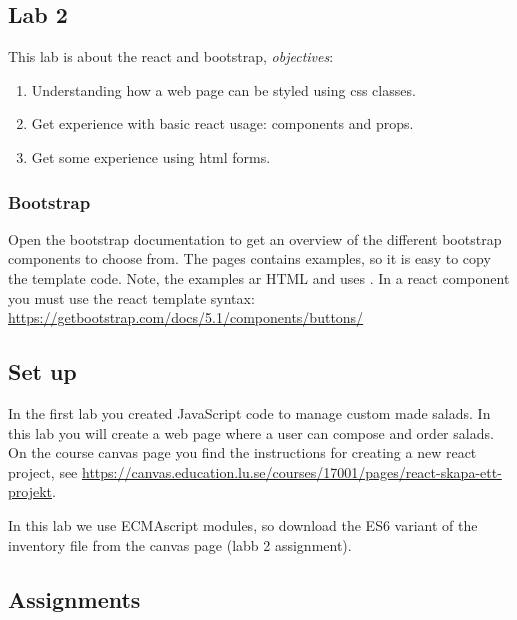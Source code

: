 \documentclass[fleqn, article, a4paper]{memoir}
\begin{document}
\maketitle
\thispagestyle{titlepage}
\vspace{-4cm}

\subsection*{Lab 2}

\n This lab is about the react and bootstrap, \emph{objectives}:

\begin{enumerate}\firmlist
\item Understanding how a web page can be styled using css classes.
\item Get experience with basic react usage: components and props.
\item Get some experience using html forms.
\end{enumerate}

\subsubsection*{Bootstrap}
Open the bootstrap documentation to get an overview of the different bootstrap components to choose from. The pages contains examples, so it is easy to copy the template code. Note, the examples ar HTML and uses . In a react component you must use the react template syntax:
\\ \url{https://getbootstrap.com/docs/5.1/components/buttons/}

\subsection*{Set up}

In the first lab you created JavaScript code to manage custom made salads. In this lab you will create a web page where a user can compose and order salads. On the course canvas page you find the instructions for creating a new react project, see \url{https://canvas.education.lu.se/courses/17001/pages/react-skapa-ett-projekt}.

In this lab we use ECMAscript modules, so download the ES6 variant of the inventory file from the canvas page (labb 2 assignment).
\subsection*{Assignments}
\end{document}
